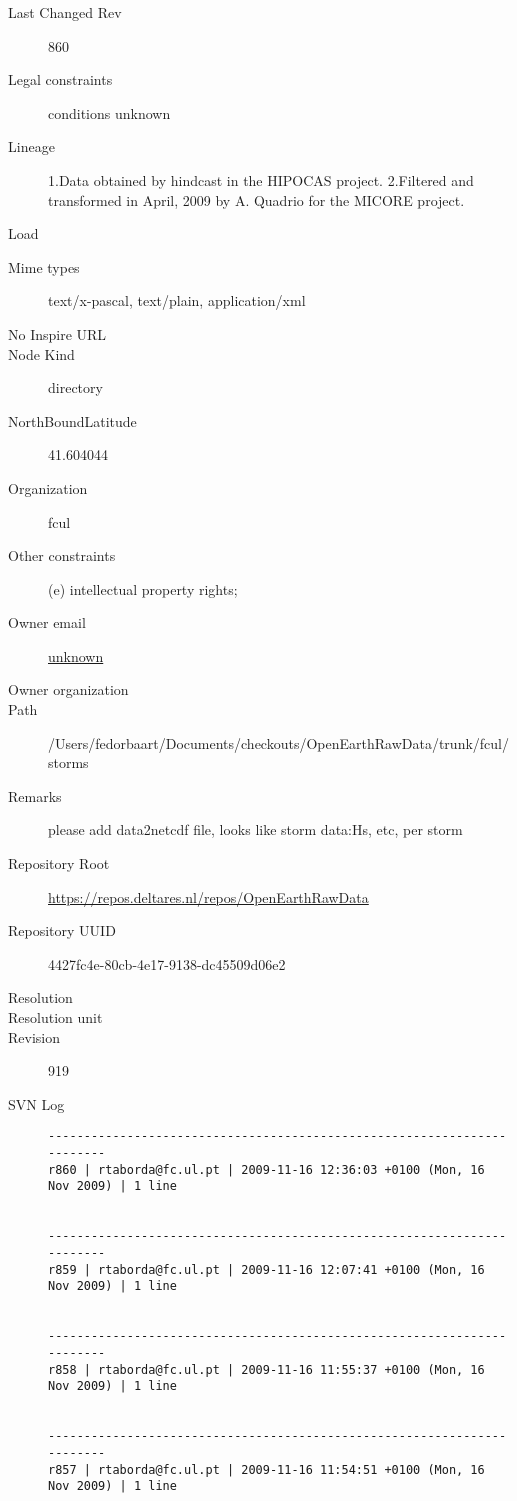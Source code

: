 \documentclass[9]{report}
\begin{document}
\begin{description}
  \item[Last Changed Rev] 860
  \item[Legal constraints] conditions unknown
  \item[Lineage] 1.Data obtained by hindcast in the HIPOCAS project.
2.Filtered and transformed in April, 2009 by A. Quadrio for the MICORE project.
  \item[Load] \textcolor{blue}{}
  \item[Mime types] text/x-pascal, text/plain, application/xml
  \item[No Inspire URL] 
  \item[Node Kind] directory
  \item[NorthBoundLatitude] 41.604044
  \item[Organization] fcul
  \item[Other constraints] (e) intellectual property rights;
  \item[Owner email] \href{mailto:unknown}{unknown}
  \item[Owner organization] 
  \item[Path] /Users/fedorbaart/Documents/checkouts/OpenEarthRawData/trunk/fcul/storms
  \item[Remarks] please add data2netcdf file, looks like storm data:Hs, etc, per storm
  \item[Repository Root] \href{https://repos.deltares.nl/repos/OpenEarthRawData}{https://repos.deltares.nl/repos/OpenEarthRawData}
  \item[Repository UUID] 4427fc4e-80cb-4e17-9138-dc45509d06e2
  \item[Resolution] 
  \item[Resolution unit] 
  \item[Revision] 919
  \item[SVN Log] \begin{verbatim}
------------------------------------------------------------------------
r860 | rtaborda@fc.ul.pt | 2009-11-16 12:36:03 +0100 (Mon, 16 Nov 2009) | 1 line


------------------------------------------------------------------------
r859 | rtaborda@fc.ul.pt | 2009-11-16 12:07:41 +0100 (Mon, 16 Nov 2009) | 1 line


------------------------------------------------------------------------
r858 | rtaborda@fc.ul.pt | 2009-11-16 11:55:37 +0100 (Mon, 16 Nov 2009) | 1 line


------------------------------------------------------------------------
r857 | rtaborda@fc.ul.pt | 2009-11-16 11:54:51 +0100 (Mon, 16 Nov 2009) | 1 line



\end{verbatim}
\end{description}
\end{document}
